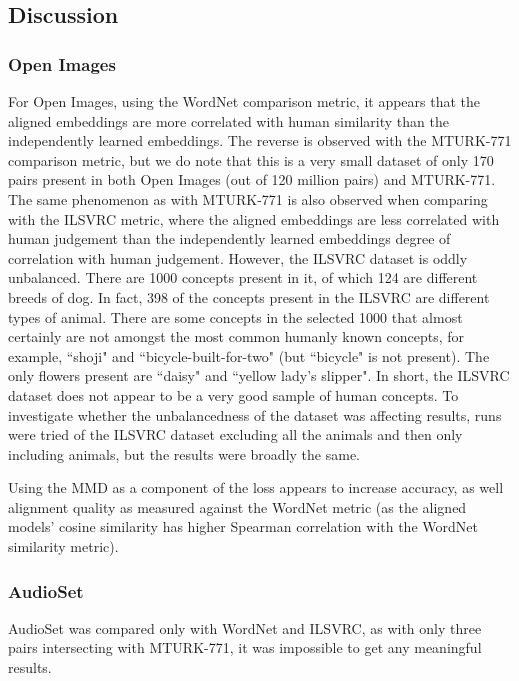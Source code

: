 \subsection{Discussion}

\subsubsection{Open Images}

For Open Images, using the WordNet comparison metric, it appears that the aligned embeddings are more correlated with human similarity than the independently learned embeddings. The reverse is observed with the MTURK-771 comparison metric, but we do note that this is a very small dataset of only 170 pairs present in both Open Images (out of 120 million pairs) and MTURK-771. The same phenomenon as with MTURK-771 is also observed when comparing with the ILSVRC metric, where the aligned embeddings are less correlated with human judgement than the independently learned embeddings degree of correlation with human judgement. However, the ILSVRC dataset is oddly unbalanced. There are 1000 concepts present in it, of which 124 are different breeds of dog. In fact, 398 of the concepts present in the ILSVRC are different types of animal. There are some concepts in the selected 1000 that almost certainly are not amongst the most common humanly known concepts, for example, ``shoji" and ``bicycle-built-for-two" (but ``bicycle" is not present). The only flowers present are ``daisy" and ``yellow lady's slipper". In short, the ILSVRC dataset does not appear to be a very good sample of human concepts. To investigate whether the unbalancedness of the dataset was affecting results, runs were tried of the ILSVRC dataset excluding all the animals and then only including animals, but the results were broadly the same. 

Using the MMD as a component of the loss appears to increase accuracy, as well alignment quality as measured against the WordNet metric (as the aligned models' cosine similarity has higher Spearman correlation with the WordNet similarity metric). 

\subsubsection{AudioSet}

AudioSet was compared only with WordNet and ILSVRC, as with only three pairs intersecting with MTURK-771, it was impossible to get any meaningful results. 

